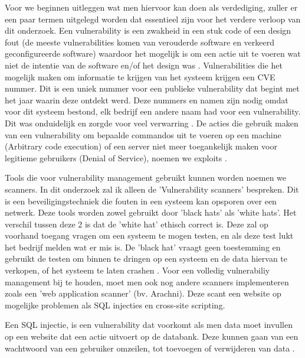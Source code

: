 Voor we beginnen uitleggen wat men hiervoor kan doen als verdediging, zuller er een paar termen uitgelegd worden dat essentieel zijn voor het verdere verloop van dit onderzoek. Een vulnerability is een zwakheid in een stuk code of een design fout (de meeste vulnerabilities komen van verouderde software en verkeerd geconfigureerde software) waardoor het mogelijk is om een actie uit te voeren wat niet de intentie van de software en/of het design was \textcite{Techtarget-vuln}. Vulnerabilities die het mogelijk maken om informatie te krijgen van het systeem krijgen een CVE nummer. Dit is een uniek nummer voor een publieke vulnerability dat begint met het jaar waarin deze ontdekt werd. Deze nummers en namen zijn nodig omdat voor dit systeem bestond, elk bedrijf een andere naam had voor een vulnerability. Dit was onduidelijk en zorgde voor veel verwarring \textcite{cve-mitre}. De acties die gebruik maken van een vulnerability om bepaalde commandos uit te voeren op een machine (Arbitrary code execution) of een server niet meer toegankelijk maken voor legitieme gebruikers (Denial of Service), noemen we exploits \textcite{Techtarget-exploit}.

Tools die voor vulnerability management gebruikt kunnen worden noemen we scanners. In dit onderzoek zal ik alleen de 'Vulnerability scanners' bespreken. Dit is een beveiligingstechniek die fouten in een systeem kan opsporen \textcite{Techopedia} over een netwerk. Deze tools worden zowel gebruikt door 'black hats' als 'white hats'. Het verschil tussen deze 2 is dat de 'white hat' ethisch correct is. Deze zal op voorhand toegang vragen om een systeem te mogen testen, en als deze test lukt het bedrijf melden wat er mis is. De 'black hat' vraagt geen toestemming en gebruikt de testen om binnen te dringen op een systeem en de data hiervan te verkopen, of het systeem te laten crashen \textcite{Howtogeek}. Voor een volledig vulnerabiliy management bij te houden, moet men ook nog andere scanners implementeren zoals een 'web application scanner' (bv. Arachni). Deze scant een website op mogelijke problemen als SQL injecties en cross-site scripting. 

Een SQL injectie, is een vulnerability dat voorkomt als men data moet invullen op een website dat een actie uitvoert op de databank. Deze kunnen gaan van een wachtwoord van een gebruiker omzeilen, tot toevoegen of verwijderen van data \textcite{acunetix}.

